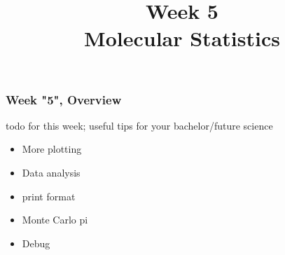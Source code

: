 

\usepackage{soul}

\title[]{Week 5\\Molecular Statistics}








{
\usebackgroundtemplate{}
\begin{frame}[plain]
    \titlepage
    \addtocounter{framenumber}{-1}
\end{frame}
}

\begin{frame}[fragile]

    \frametitle{Week "5", Overview}

    todo for this week; useful tips for your bachelor/future science

    \begin{itemize}
        \item More plotting
        \item Data analysis
        \item print format
        \item Monte Carlo pi
        \item Debug
    \end{itemize}

\end{frame}


